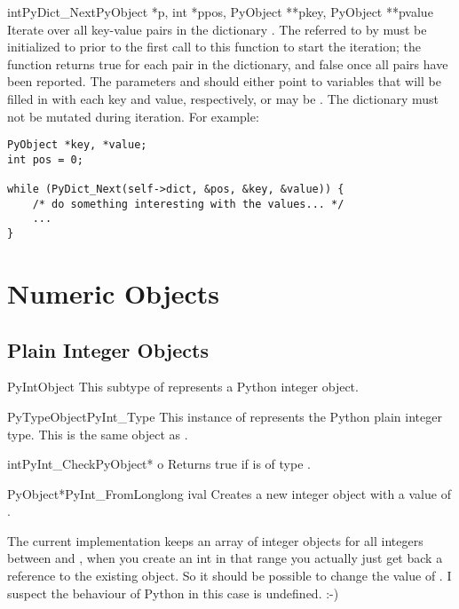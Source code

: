 \documentclass{manual}
\begin{document}
\begin{cfuncdesc}{int}{PyDict_Next}{PyObject *p, int *ppos,
                                    PyObject **pkey, PyObject **pvalue}
Iterate over all key-value pairs in the dictionary .  The
 referred to by  must be initialized to 
prior to the first call to this function to start the iteration; the
function returns true for each pair in the dictionary, and false once
all pairs have been reported.  The parameters  and
 should either point to  variables that
will be filled in with each key and value, respectively, or may be
\NULL.  The dictionary  must not be mutated during iteration.
For example:

\begin{verbatim}
PyObject *key, *value;
int pos = 0;

while (PyDict_Next(self->dict, &pos, &key, &value)) {
    /* do something interesting with the values... */
    ...
}
\end{verbatim}
\end{cfuncdesc}


\section{Numeric Objects \label{numericObjects}}



\subsection{Plain Integer Objects \label{intObjects}}

\begin{ctypedesc}{PyIntObject}
This subtype of  represents a Python integer object.
\end{ctypedesc}

\begin{cvardesc}{PyTypeObject}{PyInt_Type}
This instance of  represents the Python plain 
integer type.  This is the same object as .
\end{cvardesc}

\begin{cfuncdesc}{int}{PyInt_Check}{PyObject* o}
Returns true if  is of type .
\end{cfuncdesc}

\begin{cfuncdesc}{PyObject*}{PyInt_FromLong}{long ival}
Creates a new integer object with a value of .

The current implementation keeps an array of integer objects for all
integers between  and , when you create an int in
that range you actually just get back a reference to the existing
object. So it should be possible to change the value of . I
suspect the behaviour of Python in this case is undefined. :-)
\end{cfuncdesc}
\end{document}
